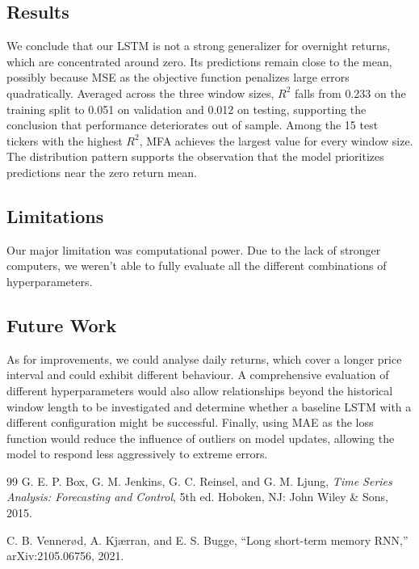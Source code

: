 \documentclass[12pt,a4paper]{article}
\begin{document}
\subsection{Results}
We conclude that our LSTM is not a strong generalizer for overnight returns,
which are concentrated around zero. Its predictions remain close to the mean,
possibly because MSE as the objective function penalizes large errors
quadratically. Averaged across the three window sizes, $R^2$ falls from 0.233
on the training split to 0.051 on validation and 0.012 on testing, supporting
the conclusion that performance deteriorates out of sample. Among the 15 test
tickers with the highest $R^2$, MFA achieves the largest value for every window
size. The distribution pattern supports the observation that the model prioritizes predictions near the zero return mean. 
\subsection{Limitations}
Our major limitation was computational power. Due to the lack of stronger computers, we weren't able to fully evaluate all the different combinations of hyperparameters. 
\subsection{Future Work}
As for improvements, we could analyse daily returns, which cover a longer
price interval and could exhibit different behaviour. A comprehensive
evaluation of different hyperparameters would also allow relationships beyond
the historical window length to be investigated and determine whether a
baseline LSTM with a different configuration might be successful. Finally,
using MAE as the loss function would reduce the influence of outliers on model
updates, allowing the model to respond less aggressively to extreme errors.

\begin{thebibliography}{99}
G. E. P. Box, G. M. Jenkins, G. C. Reinsel, and G. M. Ljung,
\textit{Time Series Analysis: Forecasting and Control}, 5th ed.
Hoboken, NJ: John Wiley \& Sons, 2015.

C. B. Venner{\o}d, A. Kj{\ae}rran, and E. S. Bugge,
``Long short-term memory RNN,'' arXiv:2105.06756, 2021.
\end{thebibliography}
\end{document}
